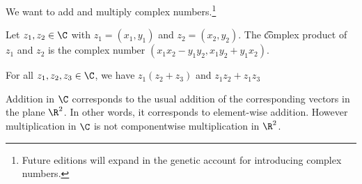 

We want to add and multiply complex numbers.\footnote{Future editions will expand in the genetic account for introducing complex numbers.}


Let $z_1, z_2 \in \C$ with $z_1 = (x_1, y_1)$ and $z_2 = (x_2, y_2)$.
The \t{complex product} of $z_1$ and $z_2$ is the complex number $(x_1x_2 - y_1y_2, x_1y_2 + y_1x_2)$.




\begin{proposition}[Distributivity]
For all $z_1, z_2, z_3 \in \C$, we have
	$z_1(z_2 + z_3)$ and $z_1z_2 + z_1z_3$
\end{proposition}


Addition in $\C$ corresponds to the usual addition of the corresponding vectors in the plane $\R^2$.
In other words, it corresponds to element-wise addition.
However multiplication in $\C$ is not componentwise multiplication in $\R^2$.

\blankpage
